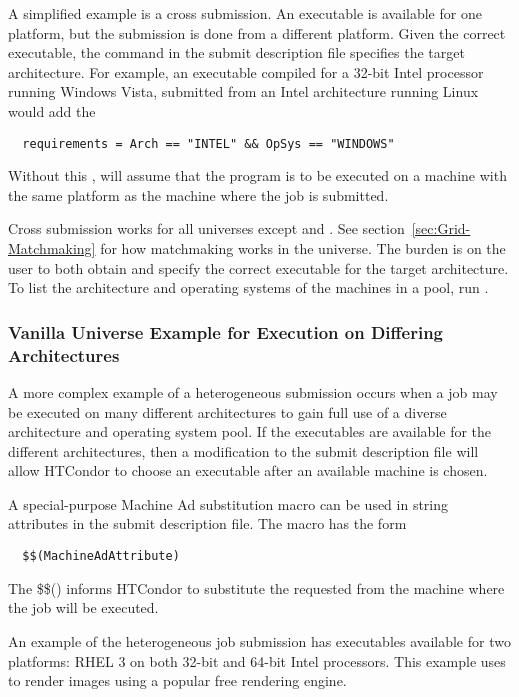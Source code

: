 A simplified example is a cross submission.
An executable is available for one platform, but
the submission is done from a different platform.
Given the correct executable, the  command in
the submit description file specifies the target architecture.
For example, an executable compiled for a 32-bit Intel processor
running  Windows Vista, submitted
from an Intel architecture running Linux would add the 
\begin{verbatim}
  requirements = Arch == "INTEL" && OpSys == "WINDOWS"
\end{verbatim}
Without this , 
will assume that the program is to be executed on
a machine with the same platform as the machine where the job
is submitted.

Cross submission works for all universes except  and
.
See section~\ref{sec:Grid-Matchmaking} for how matchmaking works in the
 universe.
The burden is on the user to both obtain and specify
the correct executable for the target architecture.
To list the architecture and operating systems of the machines
in a pool, run .

\subsubsection{Vanilla Universe Example for Execution on Differing Architectures} 

A more complex example of a heterogeneous submission
occurs when a job may be executed on
many different architectures to gain full
use of a diverse architecture and operating system pool.
If the executables are available for the different architectures,
then a modification to the submit description file
will allow HTCondor to choose an executable after an
available machine is chosen.

A special-purpose Machine Ad substitution macro can be used in
string
attributes in the submit description file.
The macro has the form
\begin{verbatim}
  $$(MachineAdAttribute)
\end{verbatim}
The \$\$() informs HTCondor to substitute the requested 
from the machine where the job will be executed.

An example of the heterogeneous job submission
has executables available for two platforms:
RHEL 3 on both 32-bit and 64-bit Intel processors.
This example uses 
to render images using a popular free rendering engine.

